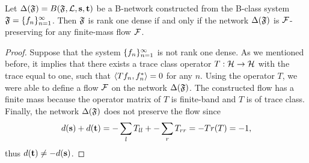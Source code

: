 \documentclass[12pt,oneside,a4paper]{amsart}
\begin{document}
      \begin{theorem}
        \label{thm-graph-eq}
          Let $\net(\fsys) = B(\fsys, \len, \source, \sink)$ be a B-network constructed
            from the B-class system $\fsys = \seq{f}$.
          Then $\fsys$ is rank one dense if and only if
            the network $\net(\fsys)$ is $\flow$-preserving for any finite-mass flow $\flow$.
      \end{theorem}
      \begin{proof}
        Suppose that the system $\seq{f}$ is not rank one dense.
        As we mentioned before, it implies that there exists a trace class operator $T: \cal{H} \to \cal{H}$ with
          the trace equal to one, such that $\inner{Tf_n}{f_n^*} = 0$ for any $n$.
        Using the operator $T$, we were able to define a flow $\flow$ on the network $\net(\fsys)$.
        The constructed flow has a finite mass because the operator matrix of $T$ is finite-band and $T$ is of trace class.
        Finally, the network $\net(\fsys)$ does not preserve the flow since
        \[
          d(\source) + d(\sink) = -\sum_{l} T_{ll} + -\sum_{r} T_{rr} = -Tr(T) = -1,
        \]
        thus $d(\sink) \neq -d(\source)$.


\end{proof}
\end{document}
